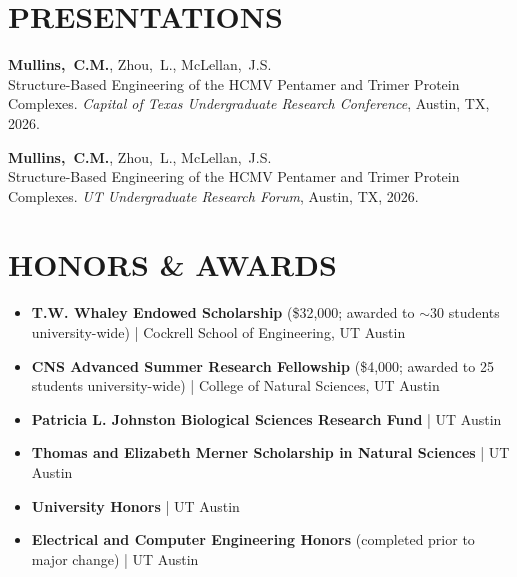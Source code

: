 \documentclass[11pt]{article}
\begin{document}

\section*{PRESENTATIONS}

{\small\begin{enumerate}[leftmargin=*, label={[\arabic*]}]
\item \textbf{Mullins,~C.M.}, Zhou,~L., McLellan,~J.S.\\
  Structure-Based Engineering of the HCMV Pentamer and Trimer Protein Complexes.
  \textit{Capital of Texas Undergraduate Research Conference}, Austin, TX, 2026.

\item \textbf{Mullins,~C.M.}, Zhou,~L., McLellan,~J.S.\\
  Structure-Based Engineering of the HCMV Pentamer and Trimer Protein Complexes.
  \textit{UT Undergraduate Research Forum}, Austin, TX, 2026.
\end{enumerate}}


\section*{HONORS \& AWARDS}

\begin{itemize}
\item \textbf{T.W. Whaley Endowed Scholarship} (\$32,000; awarded to $\sim$30 students university-wide) | Cockrell School of Engineering, UT Austin
\item \textbf{CNS Advanced Summer Research Fellowship} (\$4,000; awarded to 25 students university-wide) | College of Natural Sciences, UT Austin
\item \textbf{Patricia L. Johnston Biological Sciences Research Fund} | UT Austin
\item \textbf{Thomas and Elizabeth Merner Scholarship in Natural Sciences} | UT Austin
\item \textbf{University Honors} | UT Austin
\item \textbf{Electrical and Computer Engineering Honors} (completed prior to major change) | UT Austin
\end{itemize}

\end{document}
